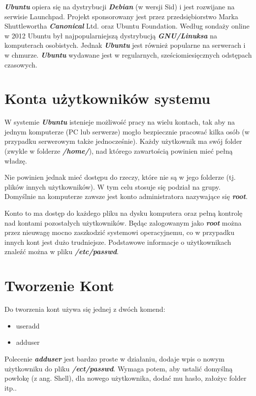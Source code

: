 \documentclass{article}
\begin{document}
\emph{\textbf{Ubuntu}} opiera się na dystrybucji \emph{\textbf{Debian}} (w wersji Sid) i jest rozwijane na serwisie Launchpad. Projekt sponsorowany jest przez przedsiębiorstwo Marka Shuttlewortha \emph{\textbf{Canonical}} Ltd. oraz Ubuntu Foundation. Według sondaży online w 2012 Ubuntu był najpopularniejszą dystrybucją \emph{\textbf{GNU/Linuksa}} na komputerach osobistych. Jednak \emph{\textbf{Ubuntu}} jest również popularne na serwerach i w chmurze. \emph{\textbf{Ubuntu}} wydawane jest w regularnych, sześciomiesięcznych odstępach czasowych.

\section{Konta użytkowników systemu}
W systemie \emph{\textbf{Ubuntu}} istenieje  możliwość pracy na wielu kontach, tak aby na jednym komputerze (PC lub serwerze) mogło bezpiecznie pracować kilka
osób (w przypadku serwerowym także jednocześnie). Każdy użytkownik ma swój folder
(zwykle w folderze \emph{\textbf{/home/}}), nad którego zawartością powinien mieć pełną władzę. \par 
Nie powinien jednak mieć dostępu do rzeczy, które nie są w jego folderze (tj. plików innych użytkowników). W tym celu stosuje się podział na grupy. Domyślnie na komputerze zawsze jest konto administratora nazywające się 
\emph{\textbf{root}}.\par
Konto to ma dostęp do każdego pliku na dysku komputera oraz pełną kontrolę nad kontami pozostałych użytkowników. Będąc zalogowanym jako \emph{\textbf{root}} można przez nieuwagę
mocno zaszkodzić systemowi operacyjnemu, co w przypadku innych kont jest dużo trudniejsze. Podstawowe informacje o użytkownikach znaleźć można w pliku \emph{\textbf{/etc/passwd}}.

\section{Tworzenie Kont}
Do tworzenia kont używa się jednej z dwóch komend:

\begin{itemize}
    \item useradd
    \item adduser
\end{itemize}

Polecenie \emph{\textbf{adduser}} jest bardzo proste w działaniu, dodaje wpis o nowym użytkowniku do pliku \emph{\textbf{/ect/passwd}}. Wymaga potem, aby ustalić domyślną powłokę (z ang. Shell), dla nowego użytkownika, dodać mu hasło, założyc folder itp..\par
\end{document}
